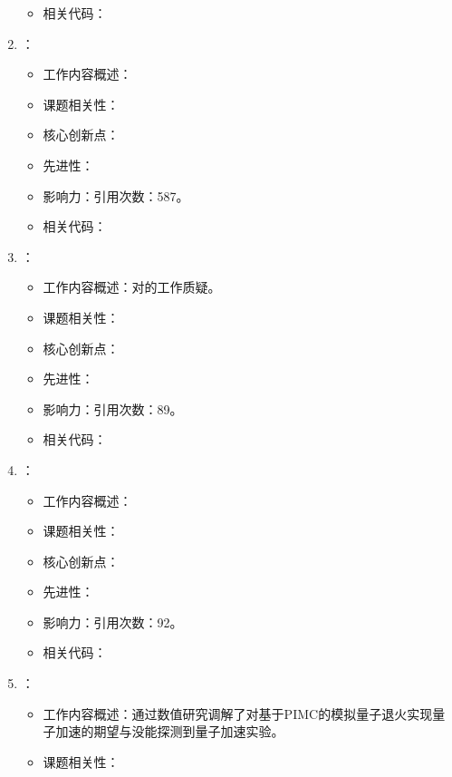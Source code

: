 \begin{enumerate}
\begin{itemize}
                \item 相关代码：
            \end{itemize}
            \item \citet{ronnow2014defining}：
            \begin{itemize}
                \item 工作内容概述：
                \item 课题相关性：
                \item 核心创新点：
                \item 先进性：
                \item 影响力：引用次数：587。
                \item 相关代码：
            \end{itemize}
            \item \citet{smolin2014classical}：
            \begin{itemize}
                \item 工作内容概述：对\citet{boixo2014evidence}的工作质疑。
                \item 课题相关性：
                \item 核心创新点：
                \item 先进性：
                \item 影响力：引用次数：89。
                \item 相关代码：
            \end{itemize}
            \item \citet{king2015benchmarking}：
            \begin{itemize}
                \item 工作内容概述：
                \item 课题相关性：
                \item 核心创新点：
                \item 先进性：
                \item 影响力：引用次数：92。
                \item 相关代码：
            \end{itemize}
            \item \citet{heim2015quantum}：
            \begin{itemize}
                \item 工作内容概述：通过数值研究调解了\citet{santoro2002theory}对基于PIMC的模拟量子退火实现量子加速的期望与\citet{ronnow2014defining}没能探测到量子加速实验。
                \item 课题相关性：

\end{itemize}
\end{enumerate}
